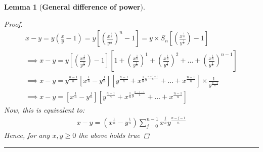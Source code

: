 \documentclass[12pt]{book}
\newtheorem{lemma}{Lemma}
\theoremstyle{definition}
\begin{document}
\begin{lemma}[\textbf{General difference of power}]
\begin{proof}
\begingroup
\addtolength{\jot}{1em}
\begin{align*}
	x-y =y\left(\frac{x}{y}-1\right) = 	y\left[\left(\frac{x^{\frac{1}{n}}}{y^{\frac{1}{n}}}\right)^{n}-1\right] = y\times S_n \left[ \left(\frac{x^{\frac{1}{n}}}{y^{\frac{1}{n}}}\right) -1 \right] \\
	\implies x-y = y\left[ \left(\frac{x^{\frac{1}{n}}}{y^{\frac{1}{n}}}\right) -1 \right]\left[ 1+	\left(\frac{x^{\frac{1}{n}}}{y^{\frac{1}{n}}}\right)^{1} + \left(\frac{x^{\frac{1}{n}}}{y^{\frac{1}{n}}}\right)^{2}+ ...+ \left(\frac{x^{\frac{1}{n}}}{y^{\frac{1}{n}}}\right)^{n-1}  \right] \\
	\implies x-y = y^{\frac{n-1}{n}}\left[x^{\frac{1}{n}} - y^{\frac{1}{n}} \right]\left[ y^{\frac{n-1}{n}} + x^{\frac{1}{n}y^{\frac{n-1 -1}{n}}}+... + x^{\frac{n-1}{n}}\right] \times \frac{1}{y^{\frac{n-1}{n}}}\\
	\implies x-y = \left[x^{\frac{1}{n}} - y^{\frac{1}{n}} \right]\left[ y^{\frac{n-1}{n}} + x^{\frac{1}{n}y^{\frac{n-1 -1}{n}}}+... + x^{\frac{n-1}{n}}\right]
\end{align*}
\endgroup
Now, this is equivalent to: 
\begin{align*}
	x-y = (x^{\frac{1}{n}}-y^{\frac{1}{n}})\sum_{j=0}^{n-1}x^{\frac{j}{n}}y^{\frac{n - j -1}{n}}	
\end{align*}
Hence, for any $x,y \geq 0$ the above holds true
\end{proof}
	
\end{lemma}
\noindent\rule{\textwidth}{1pt}



\end{document}
